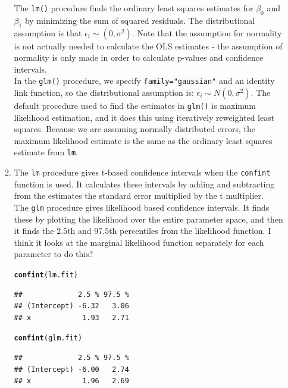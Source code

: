 \documentclass[12pt]{article}\usepackage[]{graphicx}\usepackage[]{color}
\makeatletter
\newcommand{\hlstd}[1]{\textcolor[rgb]{0.345,0.345,0.345}{#1}}%
\newcommand{\hlkwd}[1]{\textcolor[rgb]{0.737,0.353,0.396}{\textbf{#1}}}%
\newenvironment{kframe}{%
 \def\at@end@of@kframe{}%
 \ifinner\ifhmode%
  \def\at@end@of@kframe{\end{minipage}}%
  \begin{minipage}{\columnwidth}%
 \fi\fi%
 \def\FrameCommand##1{\hskip\@totalleftmargin \hskip-\fboxsep
 \colorbox{shadecolor}{##1}\hskip-\fboxsep
     \hskip-\linewidth \hskip-\@totalleftmargin \hskip\columnwidth}%
 \MakeFramed {\advance\hsize-\width
   \@totalleftmargin\z@ \linewidth\hsize
   \@setminipage}}%
 {\par\unskip\endMakeFramed%
 \at@end@of@kframe}
\newenvironment{knitrout}{}{} %
\makeatother
\begin{document}
\begin{doublespacing}
\begin{enumerate}
\begin{enumerate}
The \verb+lm()+ procedure finds the ordinary least squares estimates for $\beta_0$ and $\beta_1$ by minimizing the sum of squared residuals. The distributional assumption is that $\epsilon_i \sim (0, \sigma^2)$. Note that the assumption for normality is not actually needed to calculate the OLS estimates - the assumption of normality is only made in order to calculate p-values and confidence intervals. \\

In the \verb+glm()+ procedure, we specify \verb+family="gaussian"+ and an identity link function, so the distributional assumption is: $\epsilon_i \sim N(0, \sigma^2)$. The default procedure used to find the estimates in \verb+glm()+ is maximum likelihood estimation, and it does this using iteratively reweighted least squares. Because we are assuming normally distributed errors, the maximum likelihood estimate is the same as the ordinary least squares estimate from \verb+lm+.

\item The \verb+lm+ procedure gives t-based confidence intervals when the \verb+confint+ function is used. It calculates these intervals by adding and subtracting from the estimates the standard error multiplied by the t multiplier. \\

The \verb+glm+ procedure gives likelihood based confidence intervals. It finds these by plotting the likelihood over the entire parameter space, and then it finds the $2.5$th and $97.5$th percentiles from the likelihood function. I think it looks at the marginal likelihood function separately for each parameter to do this?

\begin{knitrout}\footnotesize
{}\color{fgcolor}\begin{kframe}
\begin{alltt}
\hlkwd{confint}\hlstd{(lm.fit)}
\end{alltt}
\begin{verbatim}
##             2.5 % 97.5 %
## (Intercept) -6.32   3.06
## x            1.93   2.71
\end{verbatim}
\begin{alltt}
\hlkwd{confint}\hlstd{(glm.fit)}
\end{alltt}


{\ttfamily\noindent\itshape\color{messagecolor}{\#\# Waiting for profiling to be done...}}\begin{verbatim}
##             2.5 % 97.5 %
## (Intercept) -6.00   2.74
## x            1.96   2.69
\end{verbatim}
\end{kframe}
\end{knitrout}


\end{enumerate}
\end{enumerate}
\end{doublespacing}
\end{document}
